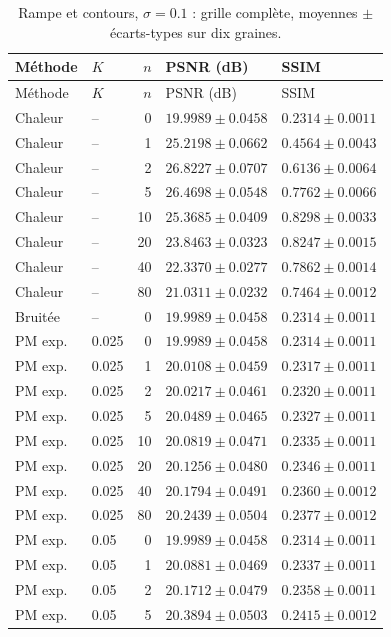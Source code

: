 \begin{longtable}{llrll}
\caption{Rampe et contours, $\sigma=0.1$ : grille complète, moyennes $\pm$ écarts-types sur dix graines.}\\
\toprule
Méthode & $K$ & $n$ & PSNR (dB) & SSIM \\
\midrule
\endfirsthead
\toprule
Méthode & $K$ & $n$ & PSNR (dB) & SSIM \\
\midrule
\endhead
\bottomrule
\endfoot
Chaleur & -- & 0 & $19.9989 \pm 0.0458$ & $0.2314 \pm 0.0011$ \\
Chaleur & -- & 1 & $25.2198 \pm 0.0662$ & $0.4564 \pm 0.0043$ \\
Chaleur & -- & 2 & $26.8227 \pm 0.0707$ & $0.6136 \pm 0.0064$ \\
Chaleur & -- & 5 & $26.4698 \pm 0.0548$ & $0.7762 \pm 0.0066$ \\
Chaleur & -- & 10 & $25.3685 \pm 0.0409$ & $0.8298 \pm 0.0033$ \\
Chaleur & -- & 20 & $23.8463 \pm 0.0323$ & $0.8247 \pm 0.0015$ \\
Chaleur & -- & 40 & $22.3370 \pm 0.0277$ & $0.7862 \pm 0.0014$ \\
Chaleur & -- & 80 & $21.0311 \pm 0.0232$ & $0.7464 \pm 0.0012$ \\
Bruitée & -- & 0 & $19.9989 \pm 0.0458$ & $0.2314 \pm 0.0011$ \\
PM exp. & 0.025 & 0 & $19.9989 \pm 0.0458$ & $0.2314 \pm 0.0011$ \\
PM exp. & 0.025 & 1 & $20.0108 \pm 0.0459$ & $0.2317 \pm 0.0011$ \\
PM exp. & 0.025 & 2 & $20.0217 \pm 0.0461$ & $0.2320 \pm 0.0011$ \\
PM exp. & 0.025 & 5 & $20.0489 \pm 0.0465$ & $0.2327 \pm 0.0011$ \\
PM exp. & 0.025 & 10 & $20.0819 \pm 0.0471$ & $0.2335 \pm 0.0011$ \\
PM exp. & 0.025 & 20 & $20.1256 \pm 0.0480$ & $0.2346 \pm 0.0011$ \\
PM exp. & 0.025 & 40 & $20.1794 \pm 0.0491$ & $0.2360 \pm 0.0012$ \\
PM exp. & 0.025 & 80 & $20.2439 \pm 0.0504$ & $0.2377 \pm 0.0012$ \\
PM exp. & 0.05 & 0 & $19.9989 \pm 0.0458$ & $0.2314 \pm 0.0011$ \\
PM exp. & 0.05 & 1 & $20.0881 \pm 0.0469$ & $0.2337 \pm 0.0011$ \\
PM exp. & 0.05 & 2 & $20.1712 \pm 0.0479$ & $0.2358 \pm 0.0011$ \\
PM exp. & 0.05 & 5 & $20.3894 \pm 0.0503$ & $0.2415 \pm 0.0012$ \\

\end{longtable}
